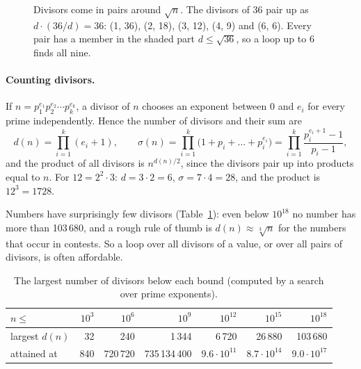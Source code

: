 \begin{figure}[htbp]
\centering
{}
\caption{Divisors come in pairs around $\sqrt n$. The divisors of 36 pair up as $d \cdot (36/d) = 36$: (1, 36), (2, 18), (3, 12),
(4, 9) and (6, 6). Every pair has a member in the shaded part $d \le \sqrt{36}$, so a loop up to 6 finds all nine.}
\label{fig:divpairs}
\end{figure}


\paragraph{Counting divisors.} If $n = p_1^{e_1} p_2^{e_2} \cdots p_k^{e_k}$, a divisor of $n$ chooses an exponent between 0 and $e_i$
for every prime independently. Hence the number of divisors and their sum are
\[
  d(n) = \prod_{i=1}^{k} (e_i + 1), \qquad
  \sigma(n) = \prod_{i=1}^{k} \bigl(1 + p_i + \dots + p_i^{e_i}\bigr) = \prod_{i=1}^{k} \frac{p_i^{e_i + 1} - 1}{p_i - 1},
\]
and the product of all divisors is $n^{d(n)/2}$, since the divisors pair up into products equal to $n$. For $12 = 2^2 \cdot 3$:
$d = 3 \cdot 2 = 6$, $\sigma = 7 \cdot 4 = 28$, and the product is $12^3 = 1728$.

Numbers have surprisingly few divisors (Table~\ref{tab:divcounts}): even below $10^{18}$ no number has more than 103\,680, and a rough
rule of thumb is $d(n) \approx \sqrt[3]{n}$ for the numbers that occur in contests. So a loop over all divisors of a value, or over
all pairs of divisors, is often affordable.

\begin{table}[htbp]
\centering\small
\begin{tabular}{@{}lrrrrrr@{}}
\toprule
$n \le$ & $10^3$ & $10^6$ & $10^9$ & $10^{12}$ & $10^{15}$ & $10^{18}$ \\
\midrule
largest $d(n)$ & 32 & 240 & 1\,344 & 6\,720 & 26\,880 & 103\,680 \\
attained at & 840 & 720\,720 & 735\,134\,400 & $9.6 \cdot 10^{11}$ & $8.7 \cdot 10^{14}$ & $9.0 \cdot 10^{17}$ \\
\bottomrule
\end{tabular}
\caption{The largest number of divisors below each bound (computed by a search over prime exponents).}
\label{tab:divcounts}
\end{table}

